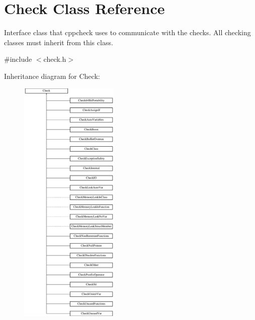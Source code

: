\hypertarget{class_check}{\section{Check Class Reference}
\label{class_check}
}


Interface class that cppcheck uses to communicate with the checks. All checking classes must inherit from this class.  




{\ttfamily \#include $<$check.\-h$>$}

Inheritance diagram for Check\-:\begin{figure}[H]
\begin{center}
\leavevmode
\includegraphics[height=12.000000cm]{class_check}
\end{center}
\end{figure}
